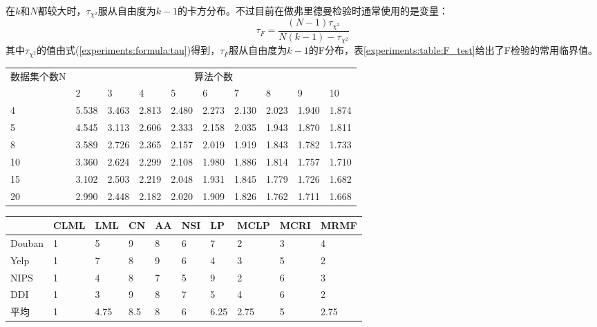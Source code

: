 在$k$和$N$都较大时，$\tau_{\chi^2}$服从自由度为$k-1$的卡方分布。不过目前在做弗里德曼检验时通常使用的是变量：
\begin{equation}
    \tau_F=\frac{(N-1)\tau_{\chi^2}}{N(k-1)-\tau_{\chi^2}} 
    \label{experiments:formula:tauF}
\end{equation}
其中$\tau_{\chi^2}$的值由式(\ref{experiments:formula:tau})得到，$\tau_F$服从自由度为$k-1$的F分布，表\ref{experiments:table:F_test}给出了F检验的常用临界值。
\zihaowu
\begin{center}
    \begin{tabular}{p{2.5cm}<{\centering}p{1cm}<{\centering}p{1cm}<{\centering}p{1cm}<{\centering}p{1cm}<{\centering}p{1cm}<{\centering}p{1cm}<{\centering}p{1cm}<{\centering}p{1cm}<{\centering}p{1.5cm}<{\centering}} \hline
        \multirow{2}{*}{数据集个数N} & \multicolumn{9}{c}{算法个数} \\ \cline{2-10}
         & 2 & 3 & 4 & 5 & 6 & 7 & 8 & 9 & 10 \\ \hline
        4 & 5.538 & 3.463 & 2.813 & 2.480 & 2.273 & 2.130 & 2.023 & 1.940 & 1.874 \\
        5 & 4.545 & 3.113 & 2.606 & 2.333 & 2.158 & 2.035 & 1.943 & 1.870 & 1.811 \\
        8 & 3.589 & 2.726 & 2.365 & 2.157 & 2.019 & 1.919 & 1.843 & 1.782 & 1.733 \\
        10 & 3.360 & 2.624 & 2.299 & 2.108 & 1.980 & 1.886 & 1.814 & 1.757 & 1.710 \\
        15 & 3.102 & 2.503 & 2.219 & 2.048 & 1.931 & 1.845 & 1.779 & 1.726 & 1.682 \\
        20 & 2.990 & 2.448 & 2.182 & 2.020 & 1.909 & 1.826 & 1.762 & 1.711 & 1.668 \\ \hline
    \end{tabular}
    \label{experiments:table:F_test}
\end{center}


\begin{center}
    \begin{tabular}{p{2.5cm}<{\centering}p{1cm}<{\centering}p{1cm}<{\centering}p{1cm}<{\centering}p{1cm}<{\centering}p{1cm}<{\centering}p{1cm}<{\centering}p{1cm}<{\centering}p{1cm}<{\centering}p{1.5cm}<{\centering}} \hline
           & CLML & LML & CN & AA & NSI & LP & MCLP & MCRI & MRMF \\ \hline
        Douban & 1 & 5 & 9 & 8 & 6 & 7 & 2 & 3 & 4 \\
        Yelp & 1 & 7 & 8 & 9 & 6 & 4 & 3 & 5 & 2 \\
        NIPS & 1 & 4 & 8 & 7 & 5 & 9 & 2 & 6 & 3 \\
        DDI  & 1 & 3 & 9 & 8 & 7 & 5 & 4 & 6 & 2 \\ \hline
        平均 & 1 & 4.75 & 8.5 & 8 & 6 & 6.25 & 2.75 & 5 & 2.75 \\ \hline
    \end{tabular}
    \label{experiments:table:rank}
\end{center}
\zihaoxiaosi

